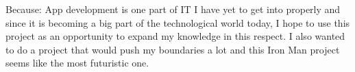 \spacedhrule{1.6em}{-0.4em}  
  

\inlineheadsection
  {Because:}
  {App development is one part of IT I have yet to get into properly and since it is becoming a big part of the technological world today, I hope to use this project as an opportunity to expand my knowledge in this respect. I also wanted to do a project that would push my boundaries a lot and this Iron Man project seems like the most futuristic one.}